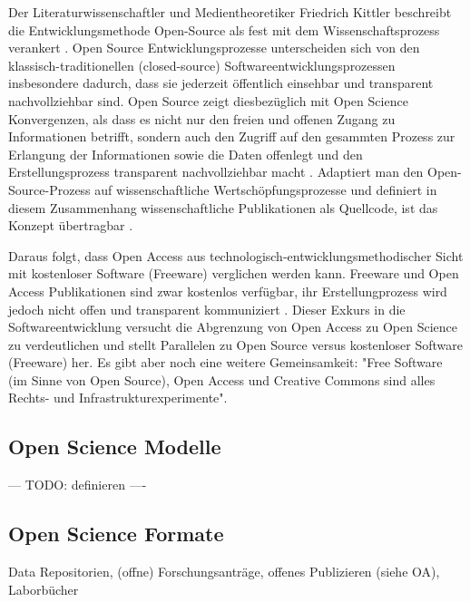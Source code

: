 Der Literaturwissenschaftler und Medientheoretiker Friedrich Kittler beschreibt die Entwicklungsmethode Open-Source als fest mit dem Wissenschaftsprozess verankert \cite{suchen}. Open Source Entwicklungsprozesse unterscheiden sich von den klassisch-traditionellen (closed-source) Softwareentwicklungsprozessen insbesondere dadurch, dass sie jederzeit öffentlich einsehbar und transparent nachvollziehbar sind. Open Source zeigt diesbezüglich mit Open Science Konvergenzen, als dass es nicht nur den freien und offenen Zugang zu Informationen betrifft, sondern auch den Zugriff auf den gesammten Prozess zur Erlangung der Informationen sowie die Daten offenlegt und den Erstellungsprozess transparent nachvollziehbar macht \cite{kelty_2004}. Adaptiert man den Open-Source-Prozess auf wissenschaftliche Wertschöpfungsprozesse und definiert in diesem Zusammenhang wissenschaftliche Publikationen als Quellcode, ist das Konzept übertragbar \cite{Singh_2008} \cite{Bradley_2008} \cite{Bradley_2007}. 

Daraus folgt, dass Open Access aus technologisch-entwicklungsmethodischer Sicht mit kostenloser Software (Freeware) \cite{suchen} verglichen werden kann. Freeware und Open Access Publikationen sind zwar kostenlos verfügbar, ihr Erstellungprozess wird jedoch nicht offen und transparent kommuniziert \cite{suchen}. Dieser Exkurs in die Softwareentwicklung versucht die Abgrenzung von Open Access zu Open Science zu verdeutlichen und stellt Parallelen zu Open Source versus kostenloser Software (Freeware) her. Es gibt aber noch eine  weitere Gemeinsamkeit: "Free Software (im Sinne von Open Source), Open Access und Creative Commons sind alles Rechts- und Infrastrukturexperimente"\cite{kelty_2004}.

\subsection{Open Science Modelle}
--- TODO: definieren ----
\subsection{Open Science Formate}
Data Repositorien, (offne) Forschungsanträge, offenes Publizieren (siehe OA), Laborbücher



